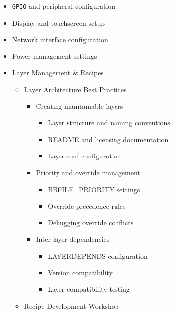 \documentclass[
]{article}
\providecommand{\tightlist}{%
  \setlength{\itemsep}{0pt}\setlength{\parskip}{0pt}}
\begin{document}
\begin{itemize}
\begin{itemize}
\begin{itemize}
      \begin{itemize}
      \tightlist
      \item
        \texttt{GPIO} and peripheral configuration
      \item
        Display and touchscreen setup
      \item
        Network interface configuration
      \item
        Power management settings
      \end{itemize}
    \end{itemize}
  \end{itemize}
\end{itemize}

\begin{itemize}
\tightlist
\item
  Layer Management \& Recipes

  \begin{itemize}
  \tightlist
  \item
    Layer Architecture Best Practices

    \begin{itemize}
    \tightlist
    \item
      Creating maintainable layers

      \begin{itemize}
      \tightlist
      \item
        Layer structure and naming conventions
      \item
        README and licensing documentation
      \item
        Layer.conf configuration
      \end{itemize}
    \item
      Priority and override management

      \begin{itemize}
      \tightlist
      \item
        BBFILE\_PRIORITY settings
      \item
        Override precedence rules
      \item
        Debugging override conflicts
      \end{itemize}
    \item
      Inter-layer dependencies

      \begin{itemize}
      \tightlist
      \item
        LAYERDEPENDS configuration
      \item
        Version compatibility
      \item
        Layer compatibility testing
      \end{itemize}
    \end{itemize}
  \item
    Recipe Development Workshop


\end{itemize}
\end{itemize}
\end{document}
